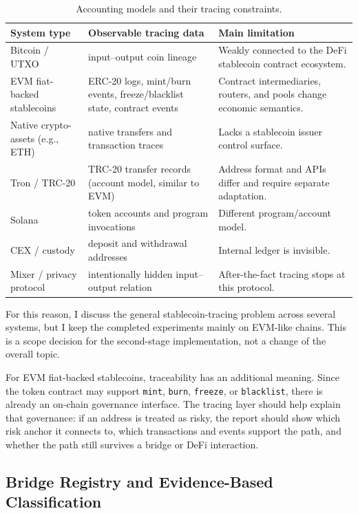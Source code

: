 \documentclass[12pt,a4paper]{article}
\begin{document}
\begin{table}[htbp]
\centering
\caption{Accounting models and their tracing constraints.}
\label{tab:accounting}
\small
\begin{tabularx}{\textwidth}{l Y Y}
\toprule
\textbf{System type} & \textbf{Observable tracing data} & \textbf{Main limitation} \\
\midrule
Bitcoin / UTXO & input--output coin lineage & Weakly connected to the DeFi stablecoin contract ecosystem. \\
EVM fiat-backed stablecoins & ERC-20 logs, mint/burn events, freeze/blacklist state, contract events & Contract intermediaries, routers, and pools change economic semantics. \\
Native crypto-assets (e.g., ETH) & native transfers and transaction traces & Lacks a stablecoin issuer control surface. \\
Tron / TRC-20 & TRC-20 transfer records (account model, similar to EVM) & Address format and APIs differ and require separate adaptation. \\
Solana & token accounts and program invocations & Different program/account model. \\
CEX / custody & deposit and withdrawal addresses & Internal ledger is invisible. \\
Mixer / privacy protocol & intentionally hidden input--output relation & After-the-fact tracing stops at this protocol. \\
\bottomrule
\end{tabularx}
\end{table}

For this reason, I discuss the general stablecoin-tracing problem across several systems, but I keep the completed experiments mainly on EVM-like chains. This is a scope decision for the second-stage implementation, not a change of the overall topic.

For EVM fiat-backed stablecoins, traceability has an additional meaning. Since the token contract may support \texttt{mint}, \texttt{burn}, \texttt{freeze}, or \texttt{blacklist}, there is already an on-chain governance interface. The tracing layer should help explain that governance: if an address is treated as risky, the report should show which risk anchor it connects to, which transactions and events support the path, and whether the path still survives a bridge or DeFi interaction.

\subsection{Bridge Registry and Evidence-Based Classification}
\end{document}
